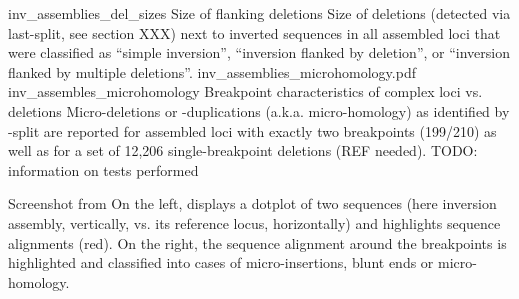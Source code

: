     {inv_assemblies_del_sizes}
    {Size of flanking deletions}
    {Size of deletions (detected via \acs{last}-split, see section XXX) next to
    inverted sequences in all assembled loci that were classified as
    ``simple inversion'', ``inversion flanked by deletion'', or ``inversion
    flanked by multiple deletions''.}
        {inv_assemblies_microhomology.pdf}
    {inv_assembles_microhomology}
    {Breakpoint characteristics of complex loci vs. deletions}
    {Micro-deletions or -duplications (a.k.a. micro-homology) as identified by
    \last-split are reported for assembled loci with exactly two breakpoints
    (199/210) as well as for a set of 12,206 single-breakpoint deletions (REF needed).
    TODO: information on tests performed}


    {Screenshot from \maze}
    {On the left, \maze displays a dotplot of two sequences (here inversion
    assembly, vertically, vs. its reference locus, horizontally) and highlights
    sequence alignments (red). On the right, the sequence alignment around the
    breakpoints is highlighted and classified into cases of micro-insertions,
    blunt ends or micro-homology.}
